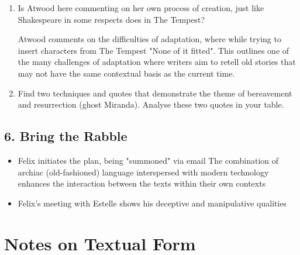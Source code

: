 			\begin{enumerate}
				\item Is Atwood here commenting on her own process of creation, just like Shakespeare in some respects does in The Tempest?

					Atwood comments on the difficulties of adaptation, where while trying to insert characters from The Tempest "None of it fitted". This outlines one of the many challenges of adaptation where writers aim to retell old stories that may not have the same contextual basis as the current time.
				\item Find two techniques and quotes that demonstrate the theme of bereavement and resurrection (ghost Miranda). Analyse these two quotes in your table.

			\end{enumerate}

	\subsection{6. Bring the Rabble}
	
		\begin{itemize}
			\item Felix initiates the plan, being "summoned" via email
				\subitem The combination of archiac (old-fashioned) language interspersed with modern technology enhances the interaction between the texts within their own contexts
			\item Felix's meeting with Estelle shows his deceptive and manipulative qualities
		\end{itemize}

\section{Notes on Textual Form}

